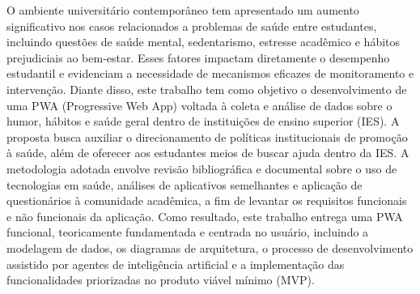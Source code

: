 \begin{resumo}


O ambiente universitário contemporâneo tem apresentado um aumento significativo nos casos relacionados a problemas de saúde entre estudantes, incluindo questões de saúde mental, sedentarismo, estresse acadêmico e hábitos prejudiciais ao bem-estar. Esses fatores impactam diretamente o desempenho estudantil e evidenciam a necessidade de mecanismos eficazes de monitoramento e intervenção. Diante disso, este trabalho tem como objetivo o desenvolvimento de uma PWA (Progressive Web App) voltada à coleta e análise de dados sobre o humor, hábitos e saúde geral dentro de instituições de ensino superior (IES). A proposta busca auxiliar o direcionamento de políticas institucionais de promoção à saúde, além de oferecer aos estudantes meios de buscar ajuda dentro da IES. A metodologia adotada envolve revisão bibliográfica e documental sobre o uso de tecnologias em saúde, análises de aplicativos semelhantes e aplicação de questionários à comunidade acadêmica, a fim de levantar os requisitos funcionais e não funcionais da aplicação. Como resultado, este trabalho entrega uma PWA funcional, teoricamente fundamentada e centrada no usuário, incluindo a modelagem de dados, os diagramas de arquitetura, o processo de desenvolvimento assistido por agentes de inteligência artificial e a implementação das funcionalidades priorizadas no produto viável mínimo (MVP).

%
%





\end{resumo}
